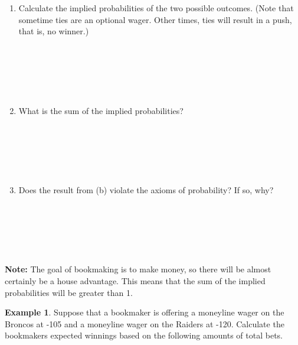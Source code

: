 \documentclass[
  11pt,
]{book}
\theoremstyle{definition}
\theoremstyle{definition}
\newtheorem{example}{Example}[chapter]
\theoremstyle{definition}
\theoremstyle{definition}
\theoremstyle{remark}
\begin{document}
\begin{enumerate}
\def\labelenumi{(\alph{enumi})}
\item
  Calculate the implied probabilities of the two possible outcomes. (Note that sometime ties are an optional wager. Other times, ties will result in a push, that is, no winner.)\\
  \strut \\
  \strut \\
  \strut \\
\item
  What is the sum of the implied probabilities?\\
  \strut \\
  \strut \\
  \strut \\
\item
  Does the result from (b) violate the axioms of probability? If so, why?\\
  \strut \\
  \strut \\
  \strut \\
\end{enumerate}

\textbf{Note:} The goal of bookmaking is to make money, so there will be almost certainly be a house advantage. This means that the sum of the implied probabilities will be greater than 1.

\begin{example}
Suppose that a bookmaker is offering a moneyline wager on the Broncos at -105 and a moneyline wager on the Raiders at -120. Calculate the bookmakers expected winnings based on the following amounts of total bets.
\end{example}
\end{document}
